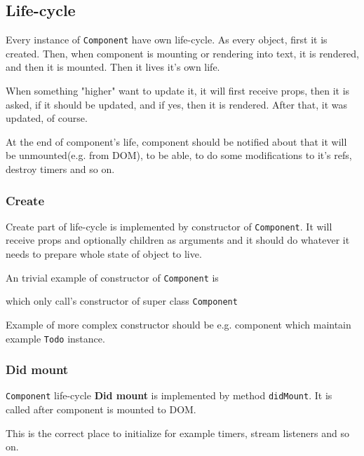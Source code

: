   \subsection{Life-cycle}\label{subsec:our-architecture-lifecycle}

    Every instance of \texttt{Component} have own life-cycle. 
    As every object, first it is created. 
    Then, when component is mounting or rendering into text, it is rendered, and then it is mounted.
    Then it lives it's own life. 

    When something "higher" want to update it, it will first receive props, 
    then it is asked, if it should be updated, and if yes, then it is rendered.
    After that, it was updated, of course.

    At the end of component's life, 
    component should be notified about that it will be unmounted(e.g. from DOM), 
    to be able, to do some modifications to it's refs, destroy timers and so on. 

    \subsubsection{Create}\label{subsec:our-architecture-lifecycle-create}

      Create part of life-cycle is implemented by constructor of \texttt{Component}. 
      It will receive props and optionally children as arguments and 
      it should do whatever it needs to prepare whole state of object to live.

      An trivial example of constructor of \texttt{Component} is 
      
      which only call's constructor of super class \texttt{Component}

      Example of more complex constructor should be e.g. component 
      which maintain example \texttt{Todo} instance.
      

    \subsubsection{Did mount}\label{subsec:our-architecture-lifecycle-didmount}

      \texttt{Component} life-cycle \textbf{Did mount} is implemented by method \texttt{didMount}. 
      It is called after component is mounted to DOM. 

      This is the correct place to initialize for example timers, stream listeners and so on. 

